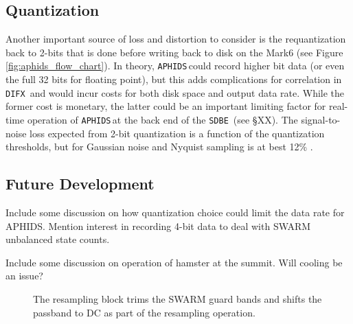 \documentclass[11pt,preprint]{aastex}
\newcommand{\SDBE}{\texttt{SDBE}}
\newcommand{\APHIDS}{\texttt{APHIDS}}
\newcommand{\DIFX}{\texttt{DIFX}}
\begin{document}
\subsection{Quantization}
Another important source of loss and distortion to consider is the requantization back to 2-bits that is done
before writing back to disk on the Mark6 (see Figure \ref{fig:aphids_flow_chart}).  In theory, \APHIDS\,could 
record higher bit data (or even the full 32 bits for floating point), but this adds complications for 
correlation 
in \DIFX\ and would incur costs for both disk space and output data rate.  While the former cost is monetary, the 
latter could be an important limiting factor for real-time operation of \APHIDS\,at the back end of the \SDBE\,
(see \S XX).  The signal-to-noise loss expected from 2-bit quantization is a function of the quantization 
thresholds, but for Gaussian noise and Nyquist sampling is at best 12\% \citep{cooper70,thompson01}.

\subsection{Future Development}

Include some discussion on how quantization choice could limit the data rate for APHIDS. 
Mention interest in recording 4-bit data to deal with SWARM unbalanced state counts.

Include some discussion on operation of hamster at the summit.  Will cooling be an issue?


\begin{figure}
\centering
{}
\label{fig:resampling_block}
\caption{The resampling block trims the SWARM guard bands and shifts the passband to DC as part of the 
resampling operation.}
\end{figure}
\end{document}
